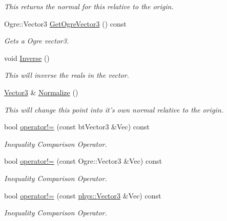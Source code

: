 \begin{DoxyCompactItemize}
\begin{DoxyCompactList}\small\item\em This returns the normal for this relative to the origin. \item\end{DoxyCompactList}\item 
Ogre::Vector3 \hyperlink{classphys_1_1Vector3_a17265d86a74139398d310b56ba7e89b8}{GetOgreVector3} () const 
\begin{DoxyCompactList}\small\item\em Gets a Ogre vector3. \item\end{DoxyCompactList}\item 
void \hyperlink{classphys_1_1Vector3_a30af9c8ae51596fa00fa7f350f9668f5}{Inverse} ()
\begin{DoxyCompactList}\small\item\em This will inverse the reals in the vector. \item\end{DoxyCompactList}\item 
\hyperlink{classphys_1_1Vector3}{Vector3} \& \hyperlink{classphys_1_1Vector3_a28d3cdf9457a14be4db6dfce584796c0}{Normalize} ()
\begin{DoxyCompactList}\small\item\em This will change this point into it's own normal relative to the origin. \item\end{DoxyCompactList}\item 
bool \hyperlink{classphys_1_1Vector3_a4c2b4de43118a6fa05288d053f75eb87}{operator!=} (const btVector3 \&Vec) const 
\begin{DoxyCompactList}\small\item\em Inequality Comparison Operator. \item\end{DoxyCompactList}\item 
bool \hyperlink{classphys_1_1Vector3_a8806444791efb7caa9cffc10b4deebef}{operator!=} (const Ogre::Vector3 \&Vec) const 
\begin{DoxyCompactList}\small\item\em Inequality Comparison Operator. \item\end{DoxyCompactList}\item 
bool \hyperlink{classphys_1_1Vector3_a9753e8b2540e15f77f724c7882462ce9}{operator!=} (const \hyperlink{classphys_1_1Vector3}{phys::Vector3} \&Vec) const 
\begin{DoxyCompactList}\small\item\em Inequality Comparison Operator. \item\end{DoxyCompactList}\item 

\end{DoxyCompactItemize}
